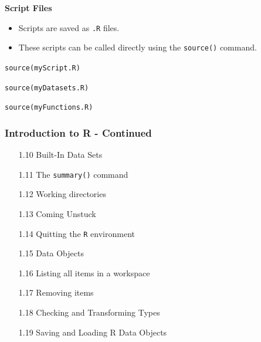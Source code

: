 \documentclass{beamer}
\begin{document}
 	\begin{frame}
 		
 		\textbf{Script Files}
 		\begin{itemize}
 			\item Scripts are saved as \texttt{.R} files. 
 			\item These scripts can be called directly using the \texttt{source()} command.
 		\end{itemize}
 		
 		\begin{framed}
 	\texttt{source(myScript.R)}
 		
 		\texttt{source(myDatasets.R)}
 		
 		\texttt{source(myFunctions.R)}
 	\end{framed}
 	\end{frame}
 	
 	\begin{frame}
 		\frametitle{Introduction to R - Continued}
 		\begin{itemize}
 			\item[1.10] Built-In Data Sets      
 			\item[1.11] The \texttt{summary()} command     
 			\item[1.12] Working directories      
 			\item[1.13] Coming Unstuck    
 			\item[1.14] Quitting the \texttt{R} environment   
 			\item[1.15] Data Objects  
 			\item[1.16] Listing all items in a workspace     
 			\item[1.17] Removing items   
 			\item[1.18] Checking and Transforming Types
 			\item[1.19] Saving and Loading R Data Objects    
 		\end{itemize}
 	\end{frame}
 	
\end{document}
